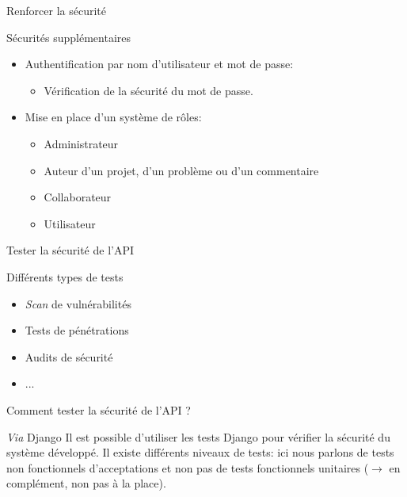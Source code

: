 \begin{frame}{Renforcer la sécurité}
  \begin{block}{Sécurités supplémentaires}
    \begin{itemize}
    \item Authentification par nom d'utilisateur et mot de passe:
      \begin{itemize}
      \item Vérification de la sécurité du mot de passe.
      \end{itemize}
    \item Mise en place d'un système de rôles:
      \begin{itemize}
      \item Administrateur
      \item Auteur d'un projet, d'un problème ou d'un commentaire
      \item Collaborateur
      \item Utilisateur
      \end{itemize}
    \end{itemize}
  \end{block}
\end{frame}

\begin{frame}{Tester la sécurité de l'API}
  \begin{block}{Différents types de tests}
    \begin{itemize}
    \item \textit{Scan} de vulnérabilités
    \item Tests de pénétrations
    \item Audits de sécurité
    \item ...
    \end{itemize}

    Comment tester la sécurité de l'API ?
  \end{block}

  \begin{block}{\textit{Via} Django}
    Il est possible d'utiliser les tests Django pour vérifier la
    sécurité du système développé. Il existe différents niveaux de
    tests: ici nous parlons de tests non fonctionnels d'acceptations
    et non pas de tests fonctionnels unitaires ($\rightarrow$ en
    complément, non pas à la place).
  \end{block}
\end{frame}


